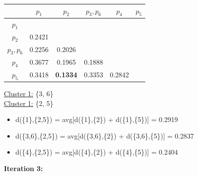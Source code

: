 \documentclass[11pt]{article}
\begin{document}
	\begin{center}
    	\begin{adjustbox}{max width=\textwidth}
		\begin{tabular}{ | c | c | c | c | c | c |}
	  	 	\hline

	  	 	& \textbf{$p_1$} & \textbf{$p_2$} & \textbf{$p_3, p_6$} & \textbf{$p_4$} & \textbf{$p_5$}\\
	  	 	\hline
	  	 	
	  	 	\textbf{$p_1$} &  &  &  &  &\\
	  	 	\hline
	  	 	
	  	 	\textbf{$p_2$} & 0.2421 &  &  &  &\\
	  	 	\hline
	  	 	
	  	 	\textbf{$p_3, p_6$} & 0.2256 & 0.2026 &  &  &\\
	  	 	\hline
	  	 	
	  	 	\textbf{$p_4$} & 0.3677 & 0.1965 & 0.1888 &  &\\
	  	 	\hline
	  	 	
	  	 	\textbf{$p_5$} & 0.3418 & \textbf{0.1334} & 0.3353 & 0.2842 &\\
	  	 	\hline			
    		\end{tabular}
    	\end{adjustbox}
	\end{center}
	
	\underline{Cluster 1:} \{3, 6\} \\
	\underline{Cluster 1:} \{2, 5\} \\
	
	\begin{itemize}
		\item d(\{1\},\{2,5\}) = avg[d(\{1\},\{2\}) + d(\{1\},\{5\})] = 0.2919
		\item d(\{3,6\},\{2,5\}) = avg[d(\{3,6\},\{2\}) + d(\{3,6\},\{5\})] = 0.2837
		\item d(\{4\},\{2,5\}) = avg[d(\{4\},\{2\}) + d(\{4\},\{5\})] = 0.2404
	\end{itemize}

	\vspace{5mm}
	
	\textbf{Iteration 3:}
	
\end{document}
